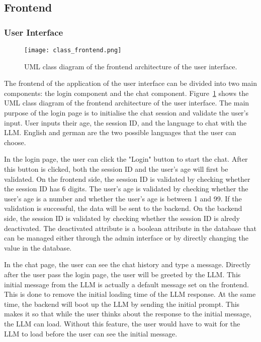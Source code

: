 \subsection{Frontend}

\subsubsection{User Interface}

\begin{figure}[h!]
    \centering
    \texttt{[image: class\_frontend.png]}
    \caption{UML class diagram of the frontend architecture of the user interface.}
    \label{class_frontend}
\end{figure}

The frontend of the application of the user interface can be divided into two main components: the login component and the chat component.
Figure~\ref{class_frontend} shows the UML class diagram of the frontend architecture of the user interface.
The main purpose of the login page is to initialise the chat session and validate the user's input.
User inputs their age, the session ID, and the language to chat with the \ac{LLM}.
English and german are the two possible languages that the user can choose.

In the login page, the user can click the "Login" button to start the chat.
After this button is clicked, both the session ID and the user's age will first be validated.
On the frontend side, the session ID is validated by checking whether the session ID has 6 digits.
The user's age is validated by checking whether the user's age is a number and whether the user's age is between 1 and 99.
If the validation is successful, the data will be sent to the backend.
On the backend side, the session ID is validated by checking whether the session ID is alredy deactivated.
The deactivated attribute is a boolean attribute in the database that can be managed either through the admin interface or by directly changing the value in the database.

In the chat page, the user can see the chat history and type a message.
Directly after the user pass the login page, the user will be greeted by the \ac{LLM}.
This initial message from the \ac{LLM} is actually a default message set on the frontend.
This is done to remove the initial loading time of the \ac{LLM} response.
At the same time, the backend will boot up the \ac{LLM} by sending the initial prompt.
This makes it so that while the user thinks about the response to the initial message, the \ac{LLM} can load.
Without this feature, the user would have to wait for the \ac{LLM} to load before the user can see the initial message.

